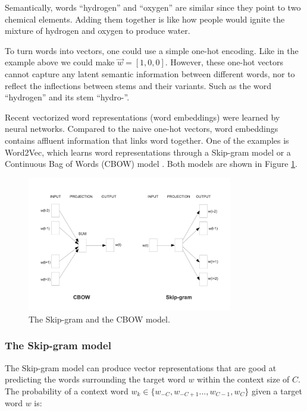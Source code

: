 \documentclass[thesis,fonts=libertine]{cluu}
\begin{document}
Semantically, words ``hydrogen'' and ``oxygen'' are similar since they point to two chemical elements. Adding them together is like how people would ignite the mixture of hydrogen and oxygen to produce water.

To turn words into vectors, one could use a simple one-hot encoding. Like in the example above we could make $\vec{w}=[1, 0, 0]$. However, these one-hot vectors cannot capture any latent semantic information between different words, nor to reflect the inflections between stems and their variants. Such as the  word ``hydrogen'' and its stem ``hydro-''.

Recent vectorized word representations (word embeddings) were learned by neural networks.  Compared to the naive one-hot vectors, word embeddings contains affluent information that links word together. One of the examples is Word2Vec, which learns word representations through a Skip-gram model or a Continuous Bag of Words (CBOW) model \parencite{Mikolov:2013ab}. Both models are shown in Figure \ref{fig:skip_gram_and_cbow}.

\begin{figure}
  \centering
  \includegraphics[width=0.8\textwidth]{skip_gram_and_cbow_models.png}
  \caption{The Skip-gram and the CBOW model. \parencite{Mikolov:2013ac}}
  \label{fig:skip_gram_and_cbow}
\end{figure}

\subsubsection{The Skip-gram model}
The Skip-gram model can produce vector representations that are good at predicting the words surrounding the target word $w$ within the context size of $C$. The probability of a context word $w_k \in \{w_{-C}, w_{-C+1} ..., w_{C-1}, w_C\}$ given a target word $w$ is:
\end{document}
